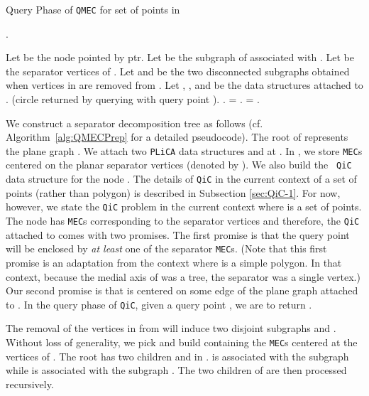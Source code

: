 \documentclass[12pt]{llncs}
\begin{document}
\begin{algorithm}[h!]
\caption{Query Phase of {\tt QMEC} for set  of points in }
\label{alg:QMECQuery}
\begin{algorithmic}[1]

  .

\STATE Let  be the node pointed by {\sc ptr}.
\STATE Let  be the subgraph of  associated with .
\STATE Let  be the separator vertices of .
\STATE Let  and  be the two disconnected subgraphs obtained when vertices in  are removed from .
\STATE Let , , and  be the data structures attached to .
\STATE  (circle returned by querying  with query point ).
\RETURN .
\ENDIF
{}
 = .
\ELSE
{} = .
\ENDIF
\ENDWHILE
\STATE {}

\end{algorithmic}
\end{algorithm}

We construct a separator decomposition tree  as follows (cf. Algorithm\ \ref{alg:QMECPrep} for a detailed pseudocode). The root  of 
 represents the plane graph . We  attach two {\tt PLiCA} data structures 
 and  at . In , we store {\tt MEC}s centered on the 
 planar separator vertices (denoted by ). We also build the {\tt 
QiC} data structure for the node . The details of {\tt QiC} in the current context of a set of points (rather than polygon)  is described in Subsection \ref{sec:QiC-1}. For now, however, we state the {\tt QiC} problem in the current context where  is a set of points. The node  has  {\tt MEC}s corresponding to the  separator vertices and therefore, the {\tt QiC} attached to  comes with two promises. The first promise is  that the query point  will be enclosed by \textit{at least} one of the separator {\tt MEC}s. (Note that this first promise is an adaptation from the context where  is a simple polygon. In that context, because the medial axis of  was a tree, the separator was  a single vertex.) Our second promise is that  is centered on some edge of the plane graph  attached to . In the query phase of {\tt QiC}, given a query point , we are to return . 


The removal of the  vertices in  from  will induce two disjoint subgraphs  and . Without loss of generality, we pick   and build  
containing the {\tt MEC}s centered at the vertices of . The root  
has two children  and  in .  is associated with the 
 subgraph  while   is associated 
with 
the  subgraph . The two children of  are then
processed recursively. 
\end{document}

